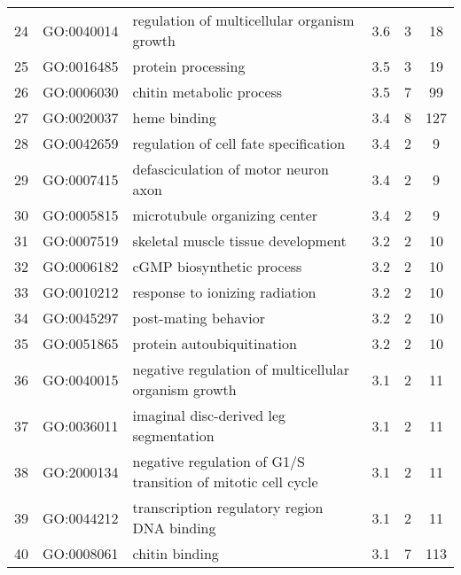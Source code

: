 \begin{tabular}{c|c|p{3in}|c|c|c}
24	&GO:0040014	&regulation of multicellular organism growth	&3.6	&3	&18\\
25	&GO:0016485	&protein processing	&3.5	&3	&19\\
26	&GO:0006030	&chitin metabolic process	&3.5	&7	&99\\
27	&GO:0020037	&heme binding	&3.4	&8	&127\\
28	&GO:0042659	&regulation of cell fate specification	&3.4	&2	&9\\
29	&GO:0007415	&defasciculation of motor neuron axon	&3.4	&2	&9\\
30	&GO:0005815	&microtubule organizing center	&3.4	&2	&9\\
31	&GO:0007519	&skeletal muscle tissue development	&3.2	&2	&10\\
32	&GO:0006182	&cGMP biosynthetic process	&3.2	&2	&10\\
33	&GO:0010212	&response to ionizing radiation	&3.2	&2	&10\\
34	&GO:0045297	&post-mating behavior	&3.2	&2	&10\\
35	&GO:0051865	&protein autoubiquitination	&3.2	&2	&10\\
36	&GO:0040015	&negative regulation of multicellular organism growth	&3.1	&2	&11\\
37	&GO:0036011	&imaginal disc-derived leg segmentation	&3.1	&2	&11\\
38	&GO:2000134	&negative regulation of G1/S transition of mitotic cell cycle	&3.1	&2	&11\\
39	&GO:0044212	&transcription regulatory region DNA binding	&3.1	&2	&11\\
40	&GO:0008061	&chitin binding	&3.1	&7	&113\\
\end{tabular}
